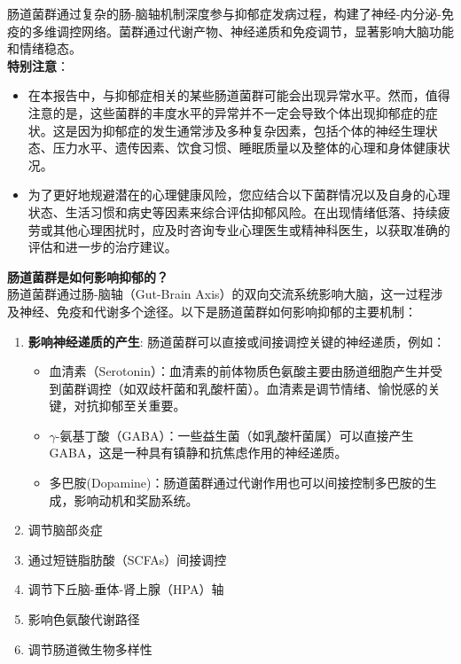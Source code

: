 \documentclass[UTF8]{ctexart}
\begin{document}
\begin{tcolorbox}[
    enhanced,
    colback=customTealBg,
    colframe=gray!3,
    arc=3mm,
    boxrule=0pt,
    width=\textwidth,
    top=8pt,
    bottom=8pt
]
{\small
{\color{customTeal}\faInfoCircle}
肠道菌群通过复杂的肠-脑轴机制深度参与抑郁症发病过程，构建了神经-内分泌-免疫的多维调控网络。菌群通过代谢产物、神经递质和免疫调节，显著影响大脑功能和情绪稳态。\\

{\color{orange}\faExclamationTriangle}
\textbf{特别注意}：
\begin{itemize}
    \item 在本报告中，与抑郁症相关的某些肠道菌群可能会出现异常水平。然而，值得注意的是，这些菌群的丰度水平的异常并不一定会导致个体出现抑郁症的症状。这是因为抑郁症的发生通常涉及多种复杂因素，包括个体的神经生理状态、压力水平、遗传因素、饮食习惯、睡眠质量以及整体的心理和身体健康状况。
    \item 为了更好地规避潜在的心理健康风险，您应结合以下菌群情况以及自身的心理状态、生活习惯和病史等因素来综合评估抑郁风险。在出现情绪低落、持续疲劳或其他心理困扰时，应及时咨询专业心理医生或精神科医生，以获取准确的评估和进一步的治疗建议。
\end{itemize}
}
\end{tcolorbox}

\begin{tcolorbox}[
    enhanced,
    colback=lightpurple!10, %
    colframe=lightpurple!10,  %
    arc=3mm,
    boxrule=0.5pt,
    width=\textwidth,
    top=8pt,
    bottom=8pt
]
{\small{\color{lightpurple}\faQuestionCircle}\quad \textbf{肠道菌群是如何影响抑郁的？}\\
{\color{orange!50}\faComments}\quad 肠道菌群通过肠-脑轴（Gut-Brain Axis）的双向交流系统影响大脑，这一过程涉及神经、免疫和代谢多个途径。以下是肠道菌群如何影响抑郁的主要机制：
\begin{enumerate}
    \item \textbf{影响神经递质的产生}: 肠道菌群可以直接或间接调控关键的神经递质，例如：
    \begin{itemize}
        \item 血清素（Serotonin）：血清素的前体物质色氨酸主要由肠道细胞产生并受到菌群调控（如双歧杆菌和乳酸杆菌）。血清素是调节情绪、愉悦感的关键，对抗抑郁至关重要。
        \item $\gamma$-氨基丁酸（GABA）：一些益生菌（如乳酸杆菌属）可以直接产生 GABA，这是一种具有镇静和抗焦虑作用的神经递质。
        \item 多巴胺(Dopamine)：肠道菌群通过代谢作用也可以间接控制多巴胺的生成，影响动机和奖励系统。
    \end{itemize}
    \item 调节脑部炎症
    \item 通过短链脂肪酸（SCFAs）间接调控
    \item 调节下丘脑-垂体-肾上腺（HPA）轴
    \item 影响色氨酸代谢路径
    \item 调节肠道微生物多样性
\end{enumerate}
}
\end{tcolorbox}
\end{document}
